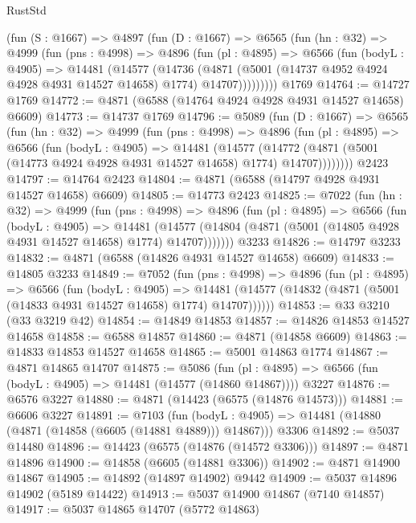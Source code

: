 \begin{lexlean}{RustStd}
\begin{coremodule}
    (fun (S : @1667) =>
    @4897
      (fun (D : @1667) =>
      @6565
        (fun (hn : @32) =>
        @4999
          (fun (pns : @4998) =>
          @4896
            (fun (pl : @4895) =>
            @6566
              (fun (bodyL : @4905) =>
              @14481
                (@14577
                  (@14736
                    (@4871
                      (@5001 (@14737 @4952 @4924 @4928 @4931 @14527 @14658) @1774)
                      @14707)))))))))
    @1769
@14764 := @14727 @1769
@14772 := @4871 (@6588 (@14764 @4924 @4928 @4931 @14527 @14658) @6609)
@14773 := @14737 @1769
@14796 := @5089
    (fun (D : @1667) =>
    @6565
      (fun (hn : @32) =>
      @4999
        (fun (pns : @4998) =>
        @4896
          (fun (pl : @4895) =>
          @6566
            (fun (bodyL : @4905) =>
            @14481
              (@14577
                (@14772 (@4871 (@5001 (@14773 @4924 @4928 @4931 @14527 @14658) @1774) @14707))))))))
    @2423
@14797 := @14764 @2423
@14804 := @4871 (@6588 (@14797 @4928 @4931 @14527 @14658) @6609)
@14805 := @14773 @2423
@14825 := @7022
    (fun (hn : @32) =>
    @4999
      (fun (pns : @4998) =>
      @4896
        (fun (pl : @4895) =>
        @6566
          (fun (bodyL : @4905) =>
          @14481
            (@14577 (@14804 (@4871 (@5001 (@14805 @4928 @4931 @14527 @14658) @1774) @14707)))))))
    @3233
@14826 := @14797 @3233
@14832 := @4871 (@6588 (@14826 @4931 @14527 @14658) @6609)
@14833 := @14805 @3233
@14849 := @7052
    (fun (pns : @4998) =>
    @4896
      (fun (pl : @4895) =>
      @6566
        (fun (bodyL : @4905) =>
        @14481 (@14577 (@14832 (@4871 (@5001 (@14833 @4931 @14527 @14658) @1774) @14707))))))
@14853 := @33 @3210 (@33 @3219 @42)
@14854 := @14849 @14853
@14857 := @14826 @14853 @14527 @14658
@14858 := @6588 @14857
@14860 := @4871 (@14858 @6609)
@14863 := @14833 @14853 @14527 @14658
@14865 := @5001 @14863 @1774
@14867 := @4871 @14865 @14707
@14875 := @5086
    (fun (pl : @4895) => @6566 (fun (bodyL : @4905) => @14481 (@14577 (@14860 @14867))))
    @3227
@14876 := @6576 @3227
@14880 := @4871 (@14423 (@6575 (@14876 @14573)))
@14881 := @6606 @3227
@14891 := @7103
    (fun (bodyL : @4905) => @14481 (@14880 (@4871 (@14858 (@6605 (@14881 @4889))) @14867)))
    @3306
@14892 := @5037 @14480
@14896 := @14423 (@6575 (@14876 (@14572 @3306)))
@14897 := @4871 @14896
@14900 := @14858 (@6605 (@14881 @3306))
@14902 := @4871 @14900 @14867
@14905 := @14892 (@14897 @14902) @9442
@14909 := @5037 @14896 @14902 (@5189 @14422)
@14913 := @5037 @14900 @14867 (@7140 @14857)
@14917 := @5037 @14865 @14707 (@5772 @14863)

\end{coremodule}
\end{lexlean}
